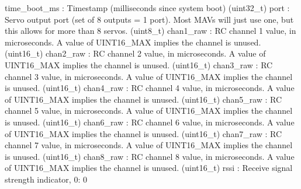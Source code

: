 \begin{DoxyVerb}
\begin{DoxyVerb}
\begin{DoxyVerb}
\begin{DoxyVerb}
\begin{DoxyVerb}
\begin{DoxyVerb}
\begin{DoxyVerb}
time_boot_ms              : Timestamp (milliseconds since system boot) (uint32_t)
port                      : Servo output port (set of 8 outputs = 1 port). Most MAVs will just use one, but this allows for more than 8 servos. (uint8_t)
chan1_raw                 : RC channel 1 value, in microseconds. A value of UINT16_MAX implies the channel is unused. (uint16_t)
chan2_raw                 : RC channel 2 value, in microseconds. A value of UINT16_MAX implies the channel is unused. (uint16_t)
chan3_raw                 : RC channel 3 value, in microseconds. A value of UINT16_MAX implies the channel is unused. (uint16_t)
chan4_raw                 : RC channel 4 value, in microseconds. A value of UINT16_MAX implies the channel is unused. (uint16_t)
chan5_raw                 : RC channel 5 value, in microseconds. A value of UINT16_MAX implies the channel is unused. (uint16_t)
chan6_raw                 : RC channel 6 value, in microseconds. A value of UINT16_MAX implies the channel is unused. (uint16_t)
chan7_raw                 : RC channel 7 value, in microseconds. A value of UINT16_MAX implies the channel is unused. (uint16_t)
chan8_raw                 : RC channel 8 value, in microseconds. A value of UINT16_MAX implies the channel is unused. (uint16_t)
rssi                      : Receive signal strength indicator, 0: 0%
 \mbox{\label{classpymavlink_1_1dialects_1_1v10_1_1MAVLink_a338a8e9d2537f93697643d15f1fa28fa}} 

\end{DoxyVerb}
\end{DoxyVerb}
\end{DoxyVerb}
\end{DoxyVerb}
\end{DoxyVerb}
\end{DoxyVerb}
\end{DoxyVerb}
